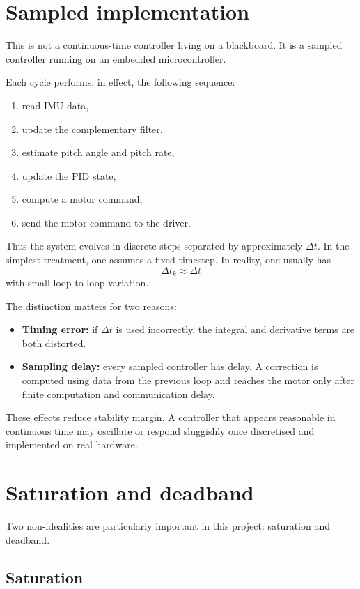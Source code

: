 \documentclass[11pt,a4paper]{article}
\begin{document}
\section{Sampled implementation}

This is not a continuous-time controller living on a blackboard. It is a sampled controller running on an embedded microcontroller.

Each cycle performs, in effect, the following sequence:
\begin{enumerate}
    \item read IMU data,
    \item update the complementary filter,
    \item estimate pitch angle and pitch rate,
    \item update the PID state,
    \item compute a motor command,
    \item send the motor command to the driver.
\end{enumerate}

Thus the system evolves in discrete steps separated by approximately \(\Delta t\). In the simplest treatment, one assumes a fixed timestep. In reality, one usually has
\[
\Delta t_k \approx \Delta t
\]
with small loop-to-loop variation.

The distinction matters for two reasons:
\begin{itemize}
    \item \textbf{Timing error:} if \(\Delta t\) is used incorrectly, the integral and derivative terms are both distorted.
    \item \textbf{Sampling delay:} every sampled controller has delay. A correction is computed using data from the previous loop and reaches the motor only after finite computation and communication delay.
\end{itemize}

These effects reduce stability margin. A controller that appears reasonable in continuous time may oscillate or respond sluggishly once discretised and implemented on real hardware.

\section{Saturation and deadband}

Two non-idealities are particularly important in this project: saturation and deadband.

\subsection*{Saturation}
\end{document}
